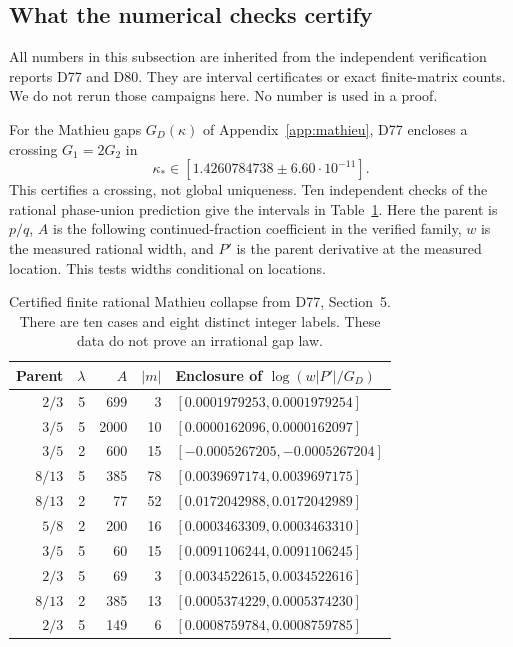 \subsection{What the numerical checks certify}\label{sec:numerics}
All numbers in this subsection are inherited from the independent verification reports D77 and D80. They are interval certificates or exact finite-matrix counts. We do not rerun those campaigns here. No number is used in a proof.

For the Mathieu gaps $G_D(\kappa)$ of Appendix~\ref{app:mathieu}, D77 encloses a crossing $G_1=2G_2$ in
\[
 \kappa_*\in[1.4260784738\mathbin{\pm}6.60\cdot10^{-11}].
\]
This certifies a crossing, not global uniqueness. Ten independent checks of the rational phase-union prediction give the intervals in Table~\ref{tab:collapse}. Here the parent is $p/q$, $A$ is the following continued-fraction coefficient in the verified family, $w$ is the measured rational width, and $P'$ is the parent derivative at the measured location. This tests widths conditional on locations.

\begin{table}[ht]
\centering\small
\begin{tabular}{@{}rrrrl@{}}
\toprule
Parent & $\lambda$ & $A$ & $|m|$ & Enclosure of $\log(w|P'|/G_D)$\\
\midrule
$2/3$ &5&699&3&$[0.0001979253,0.0001979254]$\\
$3/5$ &5&2000&10&$[0.0000162096,0.0000162097]$\\
$3/5$ &2&600&15&$[-0.0005267205,-0.0005267204]$\\
$8/13$&5&385&78&$[0.0039697174,0.0039697175]$\\
$8/13$&2&77&52&$[0.0172042988,0.0172042989]$\\
$5/8$ &2&200&16&$[0.0003463309,0.0003463310]$\\
$3/5$ &5&60&15&$[0.0091106244,0.0091106245]$\\
$2/3$ &5&69&3&$[0.0034522615,0.0034522616]$\\
$8/13$&2&385&13&$[0.0005374229,0.0005374230]$\\
$2/3$ &5&149&6&$[0.0008759784,0.0008759785]$\\
\bottomrule
\end{tabular}
\caption{Certified finite rational Mathieu collapse from D77, Section~5. There are ten cases and eight distinct integer labels. These data do not prove an irrational gap law.}\label{tab:collapse}
\end{table}

